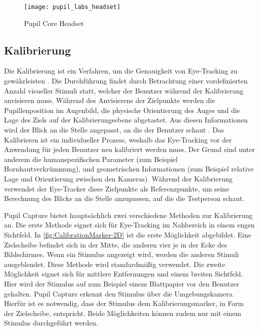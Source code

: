 \begin{figure}[!htbp]
	\centering
	\texttt{[image: pupil\_labs\_headset]}
	\caption[Pupil Core Headset]{Pupil Core Headset \cite{PupilLabsHW}}
	\label{fig:pupillabsheadset}
\end{figure}

\subsection{Kalibrierung}
\label{section:calibration}
Die Kalibrierung ist ein Verfahren, um die Genauigkeit von Eye-Tracking zu gewährleisten \cite{Clay_Koenig_Koenig_2019}. Die Durchführung findet durch Betrachtung einer vordefinierten Anzahl visueller Stimuli statt, welcher der Benutzer während der Kalibrierung anvisieren muss. Während des Anvisierens der Zielpunkte werden die Pupillenposition im Augenbild, die physische Orientierung des Auges und die Lage des Ziels auf der Kalibrierungsebene abgetastet. \cite{Lander.2018} Aus diesen Informationen wird der Blick an die Stelle angepasst, an die der Benutzer schaut \cite{Clay_Koenig_Koenig_2019}. Das Kalibrieren ist ein individueller Prozess, weshalb das Eye-Tracking vor der Anwendung für jeden Benutzer neu kalibriert werden muss. Der Grund sind unter anderem die humanspezifischen Parameter (zum Beispiel Hornhautverkrümmung), und geometrischen Informationen (zum Beispiel relative Lage und Orientierung zwischen den Kameras). \cite{Lander.2018} Während der Kalibrierung verwendet der Eye-Tracker diese Zielpunkte als Referenzpunkte, um seine Berechnung des Blicks an die Stelle anzupassen, auf die die Testperson schaut. 

Pupil Capture bietet hauptsächlich zwei verschiedene Methoden zur Kalibrierung an. Die erste Methode eignet sich für Eye-Tracking im Nahbereich in einem engen Sichtfeld. In \autoref{fig:CalibrationMarker-2D} ist die erste Möglichkeit abgebildet. Eine Zielscheibe befindet sich in der Mitte, die anderen vier je in der Ecke des Bildschirmes. Wenn ein Stimulus angezeigt wird, werden die anderen Stimuli ausgeblendet. Diese Methode wird standardmäßig verwendet. Die zweite Möglichkeit eignet sich für mittlere Entfernungen und einem breiten Sichtfeld. Hier wird der Stimulus auf zum Beispiel einem Blattpapier vor den Benutzer gehalten. Pupil Capture erkennt den Stimulus über die Umgebungskamera. Hierfür ist es notwendig, dass der Stimulus dem Kalibrierungsmarker, in Form der Zielscheibe, entspricht. Beide Möglichkeiten können zudem nur mit einem Stimulus durchgeführt werden. \cite{PupilLabsCalib}

